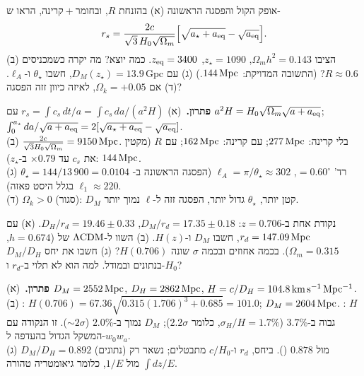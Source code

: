 \begin{exercise}{אופק הקול והפסגה הראשונה}
(א) בהזנחת $R$, ובחומר${}+$קרינה, הראו ש-
\[r_s=\frac{2c}{\sqrt3\,H_0\sqrt{\Omega_m}}\Big[\sqrt{a_\star+a_{\rm eq}}-\sqrt{a_{\rm eq}}\Big].\]
(ב) הציבו $\Omega_mh^2=0.143$, $z_\star=1090$, $z_{\rm eq}=3400$. כמה יוצא? מה יקרה כשמכניסים $R\approx0.6$? (התשובה המדויקת: $144\,\mathrm{Mpc}$.) (ג) עם $D_M(z_\star)=13.9\,\mathrm{Gpc}$, חשבו $\theta_\star$ ו-$\ell_A$. (ד) אם $\Omega_k=+0.05$, לאיזה כיוון זזה הפסגה?
\end{exercise}
\begin{solbox}
\textbf{פתרון.}\ (א) $r_s=\int c_s\,dt/a=\int c_s\,da/(a^2H)$ עם $a^2H=H_0\sqrt{\Omega_m}\sqrt{a+a_{\rm eq}}$; $\int_0^{a_\star}da/\sqrt{a+a_{\rm eq}}=2[\sqrt{a_\star+a_{\rm eq}}-\sqrt{a_{\rm eq}}]$.\\
(ב) $\frac{2c}{\sqrt3H_0\sqrt{\Omega_m}}=9150\,\mathrm{Mpc}$. בלי קרינה: $277\,\mathrm{Mpc}$; עם קרינה: $162\,\mathrm{Mpc}$; עם $R$ (מקטין את $c_s$ עד $\times0.79$ ב-$z_\star$): $144\,\mathrm{Mpc}$.\\
(ג) $\theta_\star=144/13\,900=0.0104$ רד' $=0.60^\circ$, $\ell_A=\pi/\theta_\star\approx302$ (הפסגה הראשונה ב-$\ell_1\approx220$ בגלל היסט פאזה).\\
(ד) $\Omega_k>0$ (סגור): $D_M$ קטן יותר, $\theta_\star$ גדול יותר, הפסגה זזה ל-$\ell$ נמוך יותר.
\end{solbox}

\begin{exercise}{נקודת  אחת}
 ב-$z=0.706$: $D_M/r_d=17.35\pm0.18$, $D_H/r_d=19.46\pm0.33$. (א) עם $r_d=147.09\,\mathrm{Mpc}$, חשבו $D_M$ ו-$H(z)$. (ב) השוו ל-$\Lambda\mathrm{CDM}$ של  ($h=0.674$, $\Omega_m=0.315$). בכמה אחוזים ובכמה $\sigma$ שונה $H(0.706)$? (ג) חשבו את יחס  $D_M/D_H$ בנתונים ובמודל. למה הוא לא תלוי ב-$r_d$ ו-$H_0$?
\end{exercise}
\begin{solbox}
\textbf{פתרון.}\ (א) $D_M=2552\,\mathrm{Mpc}$, $D_H=2862\,\mathrm{Mpc}$, $H=c/D_H=104.8\,\mathrm{km\,s^{-1}\,Mpc^{-1}}$.\\
(ב) : $H(0.706)=67.36\sqrt{0.315(1.706)^3+0.685}=101.0$; $D_M=2604\,\mathrm{Mpc}$. : $H$ גבוה ב-$3.7\%$ ($\sigma_H/H=1.7\%$, כלומר $2.2\sigma$); $D_M$ נמוך ב-$2.0\%$ ($\sim2\sigma$). זו הנקודה עם המשקל הגדול בהעדפה ל-$w_0w_a$.\\
(ג) $D_M/D_H=0.892$ (נתונים) מול $0.878$ (). ביחס, $r_d$ ו-$c/H_0$ מתבטלים; נשאר רק $\int dz/E$ מול $1/E$, כלומר גיאומטריה טהורה.
\end{solbox}
